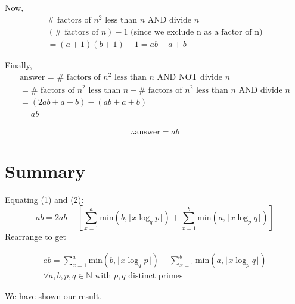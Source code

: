 \documentclass{article}
\begin{document}
Now,
\begin{equation*}
\begin{split}
    \# \text{ factors of } n^2 \text{ less than } n \text{ AND divide }n\\
    (\# \text{ factors of } n) - 1 \text{  (since we exclude n as a factor of n)}\\
    = (a+1)(b+1) - 1 = ab + a + b
\end{split}
\end{equation*}

Finally,
\begin{equation*}
\begin{split}
    \text{answer = } \# \text{ factors of } n^2 \text{ less than } n \text{ AND NOT divide }n\\
    = \# \text{ factors of }n^2 \text{ less than }n - 
    \# \text{ factors of } n^2 \text{ less than } n \text{ AND divide }n\\
    = (2ab + a + b) - (ab + a + b)\\
    = ab
\end{split}
\end{equation*}
\begin{tcolorbox}
\begin{equation}
\begin{split}
    \therefore \text{answer} = ab
\end{split}
\end{equation}
\end{tcolorbox}



\section{Summary} 
Equating (1) and (2):
\[ab = 2ab - \left[ \sum_{x=1}^a \text{min}(b, \lfloor x \log_q p\rfloor) + \sum_{x=1}^b \text{min}(a, \lfloor x \log_p q\rfloor) \right]\]
Rearrange to get
\begin{tcolorbox}
\begin{equation*}
\begin{split}
    ab = \sum_{x=1}^a \text{min}(b, \lfloor x \log_q p\rfloor) + \sum_{x=1}^b \text{min}(a, \lfloor x \log_p q\rfloor)\\
    \forall a,b,p,q \in \mathbb{N} \text{ with } p,q \text{ distinct primes}
\end{split}
\end{equation*}
\end{tcolorbox}
We have shown our result.
\end{document}
